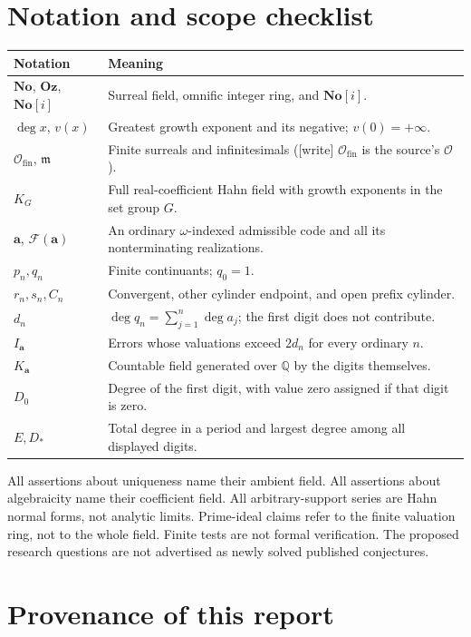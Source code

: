 \documentclass[11pt,a4paper]{article}
\numberwithin{equation}{section}
\theoremstyle{definition}
\theoremstyle{remark}
\newcommand{\No}{\mathbf{No}}
\newcommand{\Oz}{\mathbf{Oz}}
\newcommand{\SC}{\mathbf{No}[i]}
\newcommand{\Q}{\mathbb Q}
\newcommand{\Ofin}{\mathcal O_{\mathrm{fin}}}%
\newcommand{\mm}{\mathfrak m}
\newcommand{\F}{\mathcal F}
\newcommand{\dgr}{\operatorname{deg}}
\newcommand{\codea}{\boldsymbol a}
\newcommand{\wtag}{\textup{[write]}}%
\begin{document}
\appendix
\section{Notation and scope checklist}\label{ocf:app:notation}

\begin{longtable}{@{}p{}p{}@{}}
\toprule
Notation & Meaning\\
\midrule
\endhead
$\No$, $\Oz$, $\SC$ & Surreal field, omnific integer ring, and $\No[i]$.\\
$\dgr x$, $v(x)$ & Greatest growth exponent and its negative; $v(0)=+\infty$.\\
$\Ofin$, $\mm$ & Finite surreals and infinitesimals (\wtag{} $\Ofin$ is the source's $\mathcal O$).\\
$K_G$ & Full real-coefficient Hahn field with growth exponents in the set group $G$.\\
$\codea$, $\F(\codea)$ & An ordinary $\omega$-indexed admissible code and all its nonterminating realizations.\\
$p_n,q_n$ & Finite continuants; $q_0=1$.\\
$r_n,s_n,C_n$ & Convergent, other cylinder endpoint, and open prefix cylinder.\\
$d_n$ & $\dgr q_n=\sum_{j=1}^n\dgr a_j$; the first digit does not contribute.\\
$I_{\codea}$ & Errors whose valuations exceed $2d_n$ for every ordinary $n$.\\
$K_{\codea}$ & Countable field generated over $\Q$ by the digits themselves.\\
$D_0$ & Degree of the first digit, with value zero assigned if that digit is zero.\\
$E,D_*$ & Total degree in a period and largest degree among all displayed digits.\\
\bottomrule
\end{longtable}

All assertions about uniqueness name their ambient field. All assertions
about algebraicity name their coefficient field. All arbitrary-support
series are Hahn normal forms, not analytic limits. Prime-ideal claims
refer to the finite valuation ring, not to the whole field. Finite tests
are not formal verification. The proposed research questions are not
advertised as newly solved published conjectures.

\section{Provenance of this report}\label{ocf:app:report}
\end{document}

